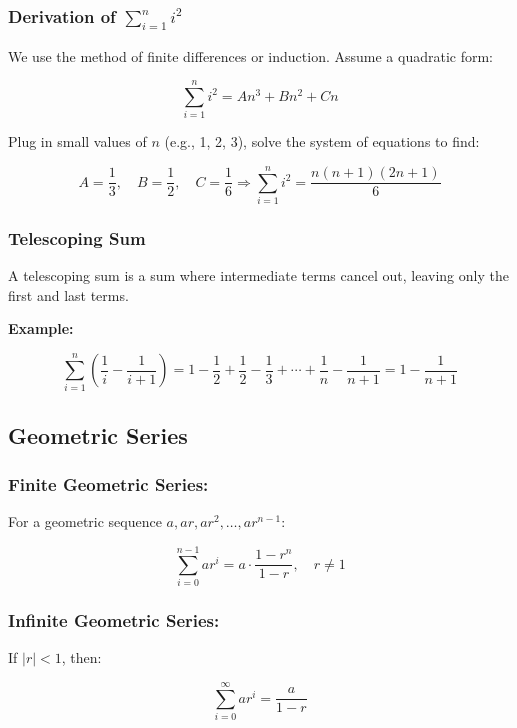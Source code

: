 \subsubsection{Derivation of \texorpdfstring{\(\sum_{i=1}^{n} i^2\)}{∑i²}}

We use the method of finite differences or induction. Assume a quadratic form:

\[
    \sum_{i=1}^{n} i^2 = An^3 + Bn^2 + Cn
\]

Plug in small values of \(n\) (e.g., 1, 2, 3), solve the system of equations to find:

\[
    A = \frac{1}{3}, \quad B = \frac{1}{2}, \quad C = \frac{1}{6}
    \Rightarrow \sum_{i = 1}^{n} i^2 = \frac{n(n+1)(2n+1)}{6}
\]

\subsubsection{Telescoping Sum}

A telescoping sum is a sum where intermediate terms cancel out, leaving only the first and last terms.
\vspace{\baselineskip}

\textbf{Example:}

\[
    \sum_{i=1}^{n} \left( \frac{1}{i} - \frac{1}{i+1} \right)
    = 1 - \frac{1}{2} + \frac{1}{2} - \frac{1}{3} + \cdots + \frac{1}{n} - \frac{1}{n+1}
    = 1 - \frac{1}{n+1}
\]

\subsection{Geometric Series}

\subsubsection{Finite Geometric Series:}

For a geometric sequence \(a, ar, ar^2, \dots, ar^{n-1}\):

\[
    \sum_{i = 0}^{n - 1} ar^i = a \cdot \frac{1 - r^n}{1 - r}, \quad r \ne 1
\]

\subsubsection{Infinite Geometric Series:}

If \(|r| < 1\), then:

\[
    \sum_{i = 0}^{\infty} ar^i = \frac{a}{1 - r}
\]

